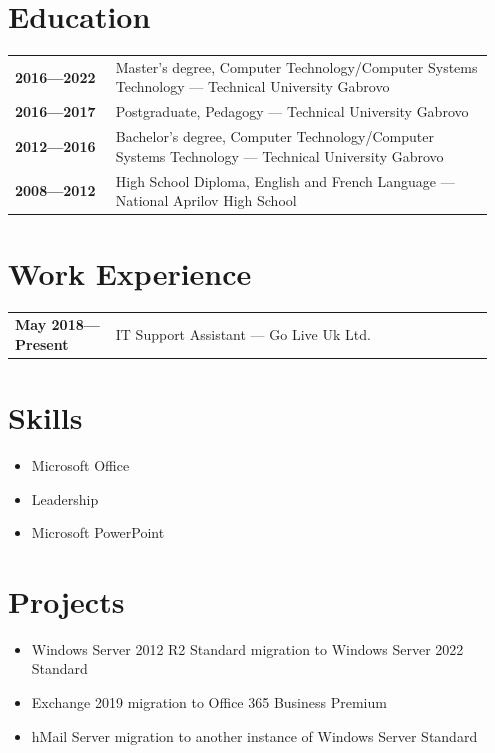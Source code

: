 \documentclass[letterpaper,6pt]{article}
\begin{document}
	\hfill
	\begin{minipage}[t]{0.5\textwidth}
		\section*{Education}
		\begin{tabular}{@{}p{0.2\linewidth} p{0.75\linewidth}}
			\textbf{2016—2022} & Master's degree, Computer Technology/Computer Systems
			Technology — Technical University Gabrovo \\
			\textbf{2016—2017} & Postgraduate, Pedagogy — Technical University Gabrovo \\
			\textbf{2012—2016} & Bachelor's degree, Computer Technology/Computer Systems
			Technology — Technical University Gabrovo \\
			\textbf{2008—2012} & High School Diploma, English and French Language — National Aprilov High School \\
		\end{tabular}
		
		\section*{Work Experience}
		\begin{tabular}{@{}p{0.2\linewidth} p{0.75\linewidth}}
			\textbf{May 2018—Present} & IT Support Assistant — Go Live Uk Ltd. \\
			
		\end{tabular}
		
		\section*{Skills}
		\begin{itemize}
			\item {Microsoft Office}
			\item {Leadership}
			\item {Microsoft PowerPoint}
		\end{itemize}
		
		\section*{Projects}
		\begin{itemize}
			\item Windows Server 2012 R2 Standard migration to Windows Server 2022 Standard
			\item Exchange 2019 migration to Office 365 Business Premium
			\item hMail Server migration to another instance of Windows Server Standard
		\end{itemize}
		

\end{minipage}
\end{document}
